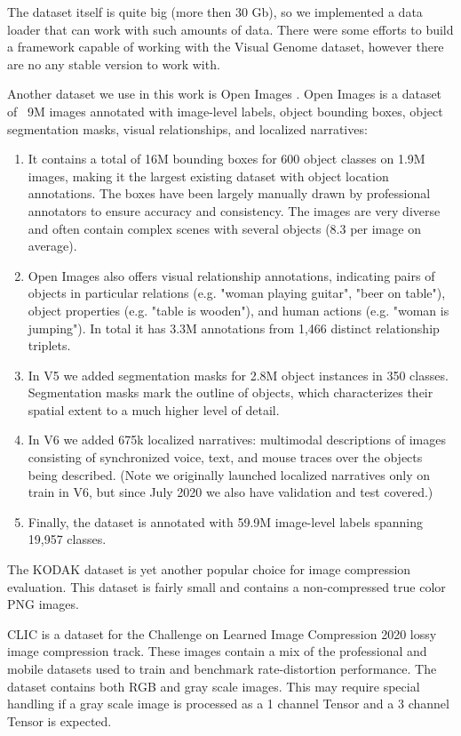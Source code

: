 The dataset itself is quite big (more then 30 Gb), so we implemented a data loader that can work with such amounts of data. There were some efforts \cite{yang_2018_graph} to build a framework capable of working with the Visual Genome dataset, however there are no any stable version to work with.

Another dataset we use in this work is Open Images \cite{OpenImages2}. Open Images is a dataset of ~9M images annotated with image-level labels, object bounding boxes, object segmentation masks, visual relationships, and localized narratives:

\begin{enumerate}
    \item It contains a total of 16M bounding boxes for 600 object classes on 1.9M images, making it the largest existing dataset with object location annotations. The boxes have been largely manually drawn by professional annotators to ensure accuracy and consistency. The images are very diverse and often contain complex scenes with several objects (8.3 per image on average).
    \item Open Images also offers visual relationship annotations, indicating pairs of objects in particular relations (e.g. "woman playing guitar", "beer on table"), object properties (e.g. "table is wooden"), and human actions (e.g. "woman is jumping"). In total it has 3.3M annotations from 1,466 distinct relationship triplets.
    \item In V5 we added segmentation masks for 2.8M object instances in 350 classes. Segmentation masks mark the outline of objects, which characterizes their spatial extent to a much higher level of detail.
    \item In V6 we added 675k localized narratives: multimodal descriptions of images consisting of synchronized voice, text, and mouse traces over the objects being described. (Note we originally launched localized narratives only on train in V6, but since July 2020 we also have validation and test covered.)
    \item Finally, the dataset is annotated with 59.9M image-level labels spanning 19,957 classes.
\end{enumerate}

The KODAK \cite{kodak} dataset is yet another popular choice for image compression evaluation. This dataset is fairly small and contains a non-compressed true color PNG images.

CLIC \cite{noauthor_clic_nodate} is a dataset for the Challenge on Learned Image Compression 2020 lossy image compression track. These images contain a mix of the professional and mobile datasets used to train and benchmark rate-distortion performance. The dataset contains both RGB and gray scale images. This may require special handling if a gray scale image is processed as a 1 channel Tensor and a 3 channel Tensor is expected.

